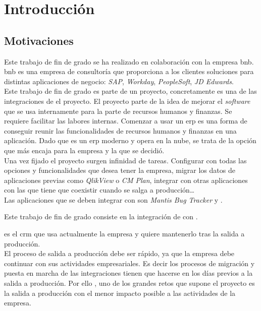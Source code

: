 \chapter{Introducción}


\section{Motivaciones}
Este trabajo de fin de grado se ha realizado en colaboración con la empresa \acrfull{bnb}.
\acrshort{bnb} es una empresa de consultoría que proporciona a los clientes soluciones para distintas aplicaciones de negocio: \textit{SAP}, \textit{Workday}, \textit{PeopleSoft}, \textit{JD Edwards}.\\

Este trabajo de fin de grado es parte de un proyecto, concretamente es una de las integraciones de el proyecto.
El proyecto parte de la idea de mejorar el \textit{software} que se usa internamente para la parte de recursos humanos y finanzas. Se requiere facilitar las labores internas.
Comenzar a usar un \acrshort{erp} es una forma de conseguir reunir las funcionalidades de recursos humanos y finanzas en una aplicación.
Dado que \wday{} es un \acrshort{erp} moderno y opera en la nube, se trata de la opción que más encaja para la empresa y la que se decidió.
\\

Una vez fijado el proyecto surgen infinidad de tareas. Configurar \wday{} con todas las opciones y funcionalidades que desea tener la empresa, migrar los datos de aplicaciones previas como \textit{QlikView} o \textit{CM Plan}, 
integrar \wday{} con otras aplicaciones con las que tiene que coexistir cuando se salga a producción\ldots\\

Las aplicaciones que se deben integrar con \wday{} son \textit{Mantis Bug Tracker} y \hs{}.

Este trabajo de fin de grado consiste en la integración de \wday{} con \hs{}.

\hs{} es el \acrshort{crm} que usa actualmente la empresa y quiere mantenerlo tras la salida a producción.\\


El proceso de salida a producción debe ser rápido, ya que la empresa debe continuar con sus actividades empresariales. 
Es decir los procesos de migración y puesta en marcha de las integraciones tienen que hacerse en los días previos a la salida a producción.
Por ello , uno de los grandes retos que supone el proyecto es la salida a producción con el menor impacto posible a las actividades de la empresa.\\



